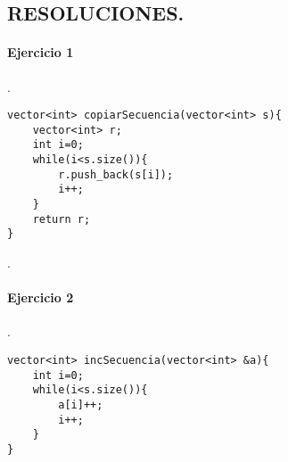 \documentclass{article}
\begin{document}
\renewcommand{\thelstlisting}{\thesection.\arabic{lstlisting}}



\begin{center}
\section*{RESOLUCIONES.}
\end{center}
\paragraph{Ejercicio 1}.

\begin{lstlisting}
vector<int> copiarSecuencia(vector<int> s){
	vector<int> r;
	int i=0;
	while(i<s.size()){
		r.push_back(s[i]);
		i++;	
	}
	return r;
}
\end{lstlisting}
.
\paragraph*{Ejercicio 2}.

\begin{lstlisting}
vector<int> incSecuencia(vector<int> &a){
	int i=0;
	while(i<s.size()){
		a[i]++;
		i++;	
	}
}
\end{lstlisting}
\end{document}
